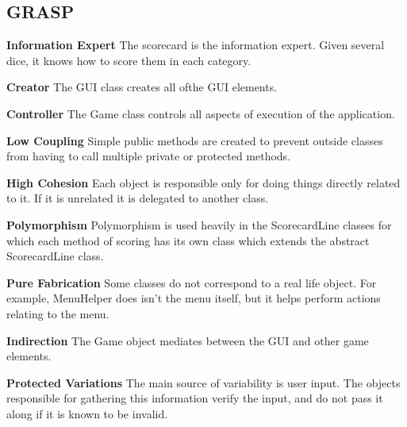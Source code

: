 \documentclass[12pt]{article}
\begin{document}
\subsection*{GRASP}
\begin{list}{}{}
\item \textbf{Information Expert}\newline
The scorecard is the information expert.  Given several dice, it knows how to score them in each category.

\item \textbf{Creator}\newline
The GUI class creates all ofthe GUI elements.

\item \textbf{Controller}\newline
The Game class controls all aspects of execution of the application.

\item \textbf{Low Coupling}\newline
Simple public methods are created to prevent outside classes from having to call multiple private or protected methods.

\item \textbf{High Cohesion}\newline
Each object is responsible only for doing things directly related to it.  If it is unrelated it is delegated to another class.

\item \textbf{Polymorphism}\newline
Polymorphism is used heavily in the ScorecardLine classes for which each method of scoring has its own class which extends the abstract ScorecardLine class.

\item \textbf{Pure Fabrication}\newline
Some classes do not correspond to a real life object.  For example, MenuHelper does isn't the menu itself, but it helps perform actions relating to the menu.

\item \textbf{Indirection}\newline
The Game object mediates between the GUI and other game elements.

\item \textbf{Protected Variations}\newline
The main source of variability is user input.  The objects responsible for gathering this information verify the input, and do not pass it along if it is known to be invalid.

\end{list}
\end{document}
